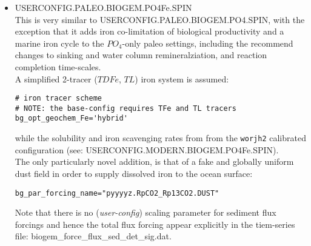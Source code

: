 \documentclass[11pt,fleqn]{book} %
\begin{document}
\begin{itemize}[noitemsep]
\vspace{2mm}
\item \textsf{\footnotesize USERCONFIG.PALEO.BIOGEM.PO4Fe.SPIN}
\vspace{1mm}
\\This is very similar to \textsf{\footnotesize USERCONFIG.PALEO.BIOGEM.PO4.SPIN}, with the exception that it adds iron co-limitation of biological productivity and a marine iron cycle to the \(PO_{4}\)-only paleo settings, including the recommend changes to sinking and water column remineralziation, and reaction completion time-scales.
\\A simplified 2-tracer (\(TDFe\), \(TL\)) iron system is assumed:
\small\vspace{-1mm}\begin{verbatim}
# iron tracer scheme
# NOTE: the base-config requires TFe and TL tracers
bg_opt_geochem_Fe='hybrid'
\end{verbatim}\vspace{-1mm}\normalsize
while the solubility and iron scavenging rates from from the \texttt{worjh2} calibrated configuration (see: \textsf{\footnotesize USERCONFIG.MODERN.BIOGEM.PO4Fe.SPIN}).
\\The only particularly novel addition, is that of a fake and globally uniform dust field in order to supply dissolved iron to the ocean surface:
\small\vspace{-1mm}\begin{verbatim}
bg_par_forcing_name="pyyyyz.RpCO2_Rp13CO2.DUST"
\end{verbatim}\vspace{-1mm}\normalsize
Note that there is no (\textit{user-config}) scaling parameter for sediment flux forcings and hence the total flux forcing appear explicitly in the tiem-series file: \textsf{\footnotesize biogem\_force\_flux\_sed\_det\_sig.dat}.


\end{itemize}
\end{document}
